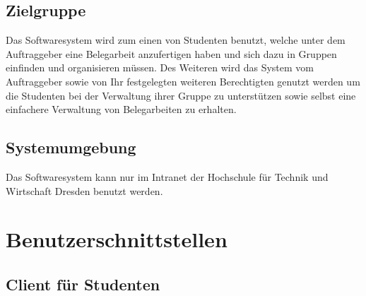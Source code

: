 \documentclass{article}
\begin{document}
\subsection{Zielgruppe}
Das Softwaresystem wird zum einen von Studenten benutzt, welche unter dem Auftraggeber eine Belegarbeit anzufertigen haben und sich dazu in Gruppen einfinden und organisieren müssen.
Des Weiteren wird das System vom Auftraggeber sowie von Ihr festgelegten weiteren Berechtigten genutzt werden um die Studenten bei der Verwaltung ihrer Gruppe zu unterstützen sowie selbst eine einfachere Verwaltung von Belegarbeiten zu erhalten.
\subsection{Systemumgebung}
Das Softwaresystem kann nur im Intranet der Hochschule für Technik und Wirtschaft Dresden benutzt werden. 

\section{Benutzerschnittstellen}
\subsection{Client für Studenten}
\end{document}
